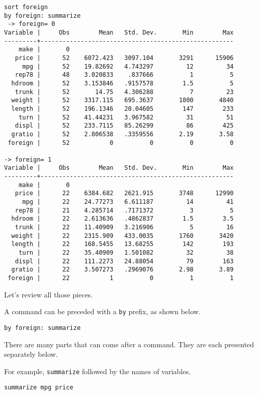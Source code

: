 \begin{lstlisting}
sort foreign
by foreign: summarize
 -> foreign= 0
Variable |     Obs        Mean   Std. Dev.       Min        Max
---------+-----------------------------------------------------
    make |       0
   price |      52    6072.423   3097.104       3291      15906
     mpg |      52    19.82692   4.743297         12         34
   rep78 |      48    3.020833    .837666          1          5
  hdroom |      52    3.153846   .9157578        1.5          5
   trunk |      52       14.75   4.306288          7         23
  weight |      52    3317.115   695.3637       1800       4840
  length |      52    196.1346   20.04605        147        233
    turn |      52    41.44231   3.967582         31         51
   displ |      52    233.7115   85.26299         86        425
  gratio |      52    2.806538   .3359556       2.19       3.58
 foreign |      52           0          0          0          0

-> foreign= 1
Variable |     Obs        Mean   Std. Dev.       Min        Max
---------+-----------------------------------------------------
    make |       0
   price |      22    6384.682   2621.915       3748      12990
     mpg |      22    24.77273   6.611187         14         41
   rep78 |      21    4.285714   .7171372          3          5
  hdroom |      22    2.613636   .4862837        1.5        3.5
   trunk |      22    11.40909   3.216906          5         16
  weight |      22    2315.909   433.0035       1760       3420
  length |      22    168.5455   13.68255        142        193
    turn |      22    35.40909   1.501082         32         38
   displ |      22    111.2273   24.88054         79        163
  gratio |      22    3.507273   .2969076       2.98       3.89
 foreign |      22           1          0          1          1
\end{lstlisting}

Let's review all those pieces.

A command can be preceded with a \lstinline{by} prefix, as shown below.

\begin{lstlisting}
by foreign: summarize
\end{lstlisting}

There are many parts that can come after a command.  They are each presented separately below.

For example, \lstinline{summarize} followed by the names of variables.

\begin{lstlisting}
summarize mpg price
\end{lstlisting}

